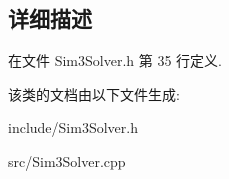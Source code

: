 \subsection{详细描述}


在文件 Sim3\-Solver.\-h 第 35 行定义.



该类的文档由以下文件生成\-:\begin{DoxyCompactItemize}
\item 
include/Sim3\-Solver.\-h\item 
src/Sim3\-Solver.\-cpp\end{DoxyCompactItemize}
